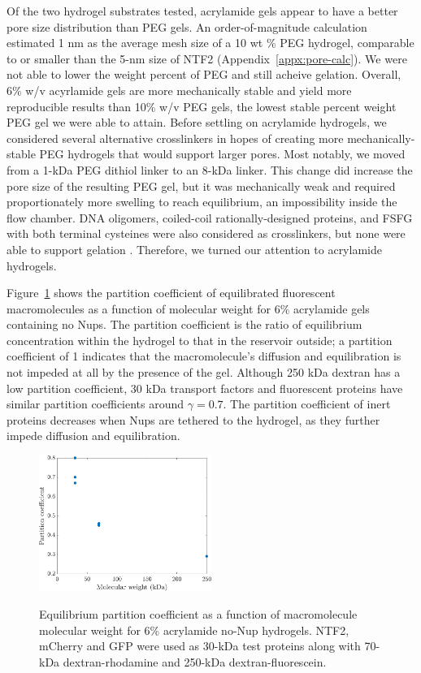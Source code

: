 Of the two hydrogel substrates tested, acrylamide gels appear to have a better pore size distribution than PEG gels.  An order-of-magnitude calculation estimated 1 nm as the average mesh size of a 10 wt \% PEG hydrogel, comparable to or smaller than the 5-nm size of NTF2 (Appendix~\ref{appx:pore-calc}).  We were not able to lower the weight percent of PEG and still acheive gelation.  Overall, 6\% w/v acyrlamide gels are more mechanically stable and yield more reproducible results than 10\% w/v PEG gels, the lowest stable percent weight PEG gel we were able to attain. Before settling on acrylamide hydrogels, we considered several alternative crosslinkers in hopes of creating more mechanically-stable PEG hydrogels that would support larger pores.  Most notably, we moved from a 1-kDa PEG dithiol linker to an 8-kDa linker.  This change did increase the pore size of the resulting PEG gel, but it was mechanically weak and required proportionately more swelling to reach equilibrium, an impossibility inside the flow chamber.  DNA oligomers, coiled-coil rationally-designed proteins, and FSFG with both terminal cysteines were also considered as crosslinkers, but none were able to support gelation \cite{brunette15,huang14}.  Therefore, we turned our attention to acrylamide hydrogels.

Figure~\ref{fig:pc-vs-mw} shows the partition coefficient of equilibrated fluorescent macromolecules as a function of molecular weight for 6\% acrylamide gels containing no Nups.  The partition coefficient is the ratio of equilibrium concentration within the hydrogel to that in the reservoir outside; a partition coefficient of 1 indicates that the macromolecule's diffusion and equilibration is not impeded at all by the presence of the gel.  Although 250 kDa dextran has a low partition coefficient, 30 kDa transport factors and fluorescent proteins have similar partition coefficients around $\gamma = 0.7$.  The partition coefficient of inert proteins decreases when Nups are tethered to the hydrogel, as they further impede diffusion and equilibration.  

\begin{figure}
\caption[Partition coefficient as a function of molecular weight.]{Equilibrium partition coefficient as a function of macromolecule molecular weight for 6\% acrylamide no-Nup hydrogels.  NTF2, mCherry and GFP were used as 30-kDa test proteins along with 70-kDa dextran-rhodamine and 250-kDa dextran-fluorescein.\\}
\centering
\includegraphics[width=0.5\textwidth]{figs/ch03/partition-coefficient-vs-mw}
\label{fig:pc-vs-mw}
\end{figure} 

